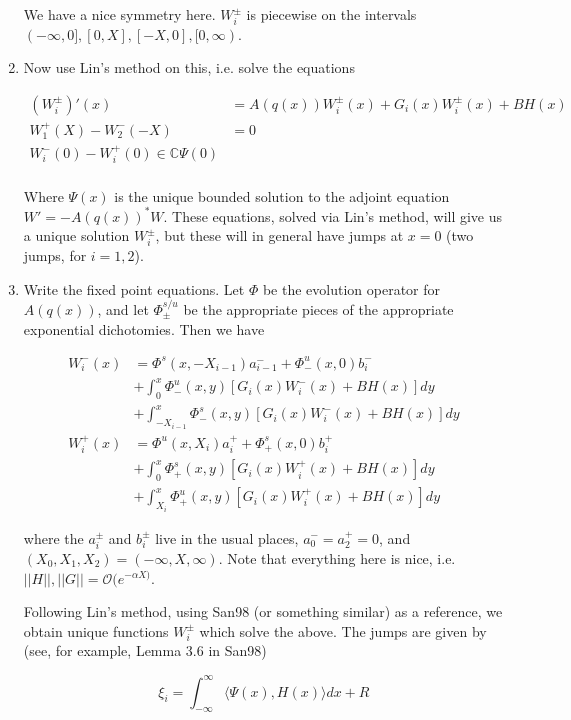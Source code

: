 \documentclass[12pt]{article}
\def\C{{\mathbb C}}
\begin{document}
\begin{enumerate}
We have a nice symmetry here. $W_i^\pm$ is piecewise on the intervals $(-\infty, 0], [0, X], [-X, 0], [0, \infty)$.

\item Now use Lin's method on this, i.e. solve the equations

\begin{align*}
(W_i^\pm)'(x) &= A(q(x)) W_i^\pm(x) + G_i(x) W_i^\pm(x)+ B H(x) \\
W_1^+(X) - W_2^-(-X) &= 0 \\
W_i^-(0) - W_i^+(0) \in \C \Psi(0) \\
\end{align*}

Where $\Psi(x)$ is the unique bounded solution to the adjoint equation $W' = -A(q(x))^* W$. These equations, solved via Lin's method, will give us a unique solution $W_i^\pm$, but these will in general have jumps at $x = 0$ (two jumps, for $i = 1, 2$).

\item Write the fixed point equations. Let $\Phi$ be the evolution operator for $A(q(x))$, and let $\Phi^{s/u}_\pm$ be the appropriate pieces of the appropriate exponential dichotomies. Then we have

\begin{align*}
W_i^-(x) &= \Phi^s(x, -X_{i-1})a_{i-1}^- + \Phi^u_-(x, 0)b_i^- \\
&+ \int_{0}^x \Phi^u_-(x, y)[G_i(x) W_i^-(x)+ B H(x)] dy \\
&+ \int_{-X_{i-1}}^x \Phi^s_-(x, y)[G_i(x) W_i^-(x)+ B H(x) ] dy \\
W_i^+(x) &= \Phi^u(x, X_i)a_i^+ + \Phi^s_+(x, 0)b_i^+ \\
&+ \int_{0}^x \Phi^s_+(x, y)[G_i(x) W_i^+(x)+ B H(x) ] dy \\
&+ \int_{X_i}^x \Phi^u_+(x, y)[G_i(x) W_i^+(x)+ B H(x) ] dy
\end{align*}

where the $a_i^\pm$ and $b_i^\pm$ live in the usual places, $a_0^- = a_2^+ = 0$, and $(X_0, X_1, X_2) = (-\infty, X, \infty)$. Note that everything here is nice, i.e. $||H||, ||G|| = \mathcal{O}(e^{-\alpha X)}$.

Following Lin's method, using San98 (or something similar) as a reference, we obtain unique functions $W_i^\pm$ which solve the above. The jumps are given by (see, for example, Lemma 3.6 in San98)

\begin{equation}
\xi_i = \int_{-\infty}^\infty \langle \Psi(x), H(x) \rangle dx + R
\end{equation}


\end{enumerate}
\end{document}

